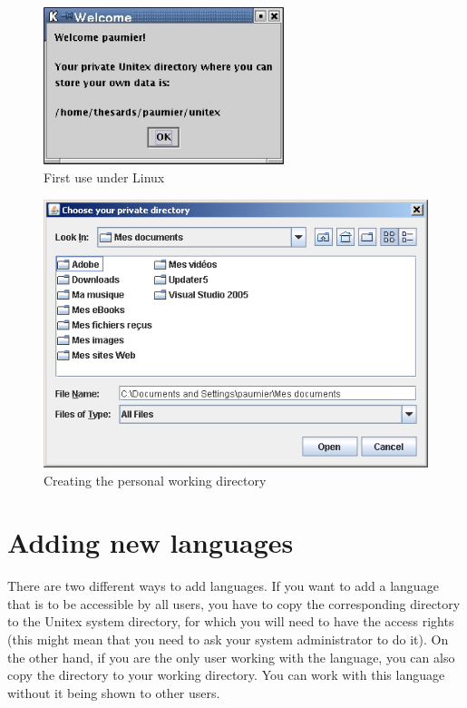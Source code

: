 \begin{figure}[!ht]
\begin{center}
\includegraphics[width=7cm]{resources/img/fig1-2.png}
\caption{First use under Linux}
\end{center}
\end{figure}

\begin{figure}[!ht]
\begin{center}
\includegraphics[width=13cm]{resources/img/fig1-3.png}
\caption{Creating the personal working
directory\label{fig-creation-personal-directory}}
\end{center}
\end{figure}



\section{Adding new languages}

\bigskip
\noindent There are two different ways to add languages. If you want to add 
a language that is to be accessible by all  users, you have to copy the 
corresponding directory to the Unitex system directory, for which 
you will need to have the access rights  (this might mean that you need to 
ask your system administrator to do it). On the other hand, if you are the only user working
with the language, you can also copy the directory to your working 
directory.
You can work with this language without it being shown to other users.


